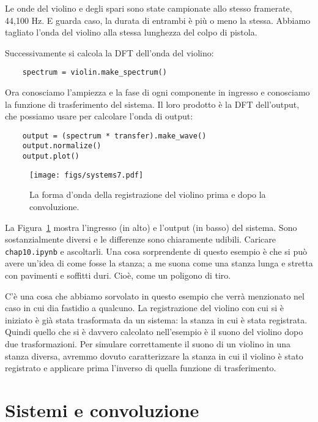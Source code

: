 \documentclass[12pt,a4paper]{book}
\begin{document}
Le onde del violino e degli spari sono state campionate allo stesso framerate, 44,100 Hz. E guarda caso, la durata di entrambi è più o meno la stessa. Abbiamo tagliato l'onda del violino alla stessa lunghezza del colpo di pistola.

Successivamente si calcola la DFT dell'onda del violino:

\begin{verbatim} 
    spectrum = violin.make_spectrum()
 \end{verbatim} 

Ora conosciamo l'ampiezza e la fase di ogni componente in ingresso e conosciamo la funzione di trasferimento del sistema. Il loro prodotto è la DFT dell'output, che possiamo usare per calcolare l'onda di output:

\begin{verbatim} 
    output = (spectrum * transfer).make_wave()
    output.normalize()
    output.plot()
 \end{verbatim} 

\begin{figure} 

\centerline{\texttt{[image: figs/systems7.pdf]}} \caption{La forma d'onda della registrazione del violino prima e dopo la convoluzione.} \label{fig.systems7} \end{figure} 

La Figura~\ref{fig.systems7} mostra l'ingresso (in alto) e l'output (in basso) del sistema. Sono sostanzialmente diversi e le differenze sono chiaramente udibili. Caricare {\tt chap10.ipynb} e ascoltarli. Una cosa sorprendente di questo esempio è che si può avere un'idea di come fosse la stanza; a me suona come una stanza lunga e stretta con pavimenti e soffitti duri. Cioè, come un poligono di tiro.

C'è una cosa che abbiamo sorvolato in questo esempio che verrà menzionato nel caso in cui dia fastidio a qualcuno. La registrazione del violino con cui si è iniziato è già stata trasformata da un sistema: la stanza in cui è stata registrata. Quindi quello che si è davvero calcolato nell'esempio è il suono del violino dopo due trasformazioni. Per simulare correttamente il suono di un violino in una stanza diversa, avremmo dovuto caratterizzare la stanza in cui il violino è stato registrato e applicare prima l'inverso di quella funzione di trasferimento.

\section{Sistemi e convoluzione} \label{sysconv} 
\end{document}

